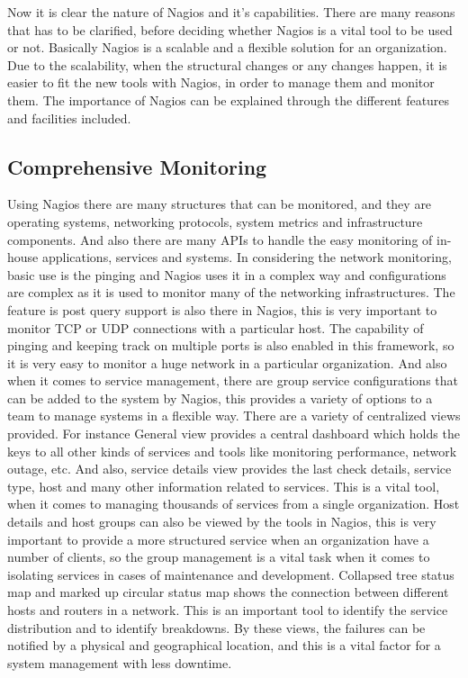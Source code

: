 \documentclass[9pt,twocolumn,twoside]{styles/osajnl}
\begin{document}
Now it is clear the nature of Nagios and it's capabilities. There are
many reasons that has to be clarified, before deciding whether Nagios
is a vital tool to be used or not. Basically Nagios is a scalable and
a flexible solution for an organization. Due to the scalability, when
the structural changes or any changes happen, it is easier to fit the
new tools with Nagios, in order to manage them and monitor them. The
importance of Nagios can be explained through the different features
and facilities included.

\subsection{Comprehensive Monitoring}

Using Nagios there are many structures that can be monitored, and they
are operating systems, networking protocols, system metrics and
infrastructure components. And also there are many APIs to handle the
easy monitoring of in-house applications, services and systems. In
considering the network monitoring, basic use is the pinging and
Nagios uses it in a complex way and configurations are complex as it
is used to monitor many of the networking infrastructures. The feature
is post query support is also there in Nagios, this is very important
to monitor TCP or UDP connections with a particular host. The
capability of pinging and keeping track on multiple ports is also
enabled in this framework, so it is very easy to monitor a huge
network in a particular organization. And also when it comes to
service management, there are group service configurations that can be
added to the system by Nagios, this provides a variety of options to a
team to manage systems in a flexible way. There are a variety of
centralized views provided. For instance General view provides a
central dashboard which holds the keys to all other kinds of services
and tools like monitoring performance, network outage, etc. And also,
service details view provides the last check details, service type,
host and many other information related to services. This is a vital
tool, when it comes to managing thousands of services from a single
organization. Host details and host groups can also be viewed by the
tools in Nagios, this is very important to provide a more structured
service when an organization have a number of clients, so the group
management is a vital task when it comes to isolating services in
cases of maintenance and development. Collapsed tree status map and
marked up circular status map shows the connection between different
hosts and routers in a network. This is an important tool to identify
the service distribution and to identify breakdowns. By these views,
the failures can be notified by a physical and geographical location,
and this is a vital factor for a system management with less downtime.
\end{document}
